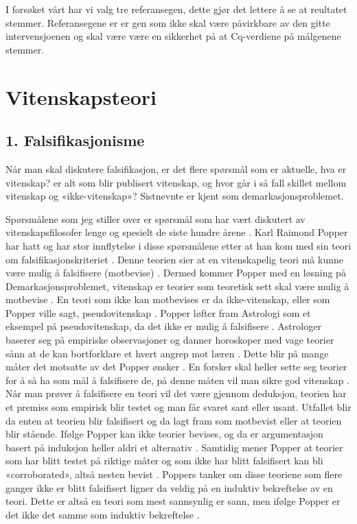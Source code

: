 \documentclass[
]{book}
\begin{document}
I forsøket vårt har vi valg tre referansegen, dette gjør det lettere å se at reultatet stemmer. Referansegene er er gen som ikke skal være påvirkbare av den gitte intervensjoenen og skal være være en sikkerhet på at Cq-verdiene på målgenene stemmer.

\hypertarget{vitenskapsteori}{%
\chapter{Vitenskapsteori}\label{vitenskapsteori}}

\hypertarget{falsifikasjonisme}{%
\section{1. Falsifikasjonisme}\label{falsifikasjonisme}}

Når man skal diskutere falsifikasjon, er det flere spørsmål som er aktuelle, hva er vitenskap? er alt som blir publisert vitenskap, og hvor går i så fall skillet mellom vitenskap og «ikke-vitenskap»? Sistnevnte er kjent som demarkasjonsproblemet.

Spørsmålene som jeg stiller over er spørsmål som har vært diskutert av vitenskapsfilosofer lenge og spesielt de siste hundre årene \citep{okasha2016}. Karl Raimond Popper har hatt og har stor innflytelse i disse spørsmålene etter at han kom med sin teori om falsifikasjonskriteriet \citep{okasha2016}. Denne teorien sier at en vitenskapelig teori må kunne være mulig å falsifisere (motbevise) \citep{popper2002}. Dermed kommer Popper med en løsning på Demarkasjonsproblemet, vitenskap er teorier som teoretisk sett skal være mulig å motbevise \citep{popper2002}. En teori som ikke kan motbevises er da ikke-vitenskap, eller som Popper ville sagt, pseudovitenskap \citep{popper2002}. Popper løfter fram Astrologi som et eksempel på pseudovitenskap, da det ikke er mulig å falsifisere \citep{popper2002}. Astrologer baserer seg på empiriske observasjoner og danner horoskoper med vage teorier sånn at de kan bortforklare et hvert angrep mot læren \citep{popper2002}. Dette blir på mange måter det motsatte av det Popper ønsker \citep{popper2002}. En forsker skal heller sette seg teorier for å så ha som mål å falsifisere de, på denne måten vil man sikre god vitenskap \citep{popper2002}. Når man prøver å falsifisere en teori vil det være gjennom deduksjon, teorien har et premiss som empirisk blir testet og man får svaret sant eller usant. Utfallet blir da enten at teorien blir falsifisert og da lagt fram som motbevist eller at teorien blir stående. Ifølge Popper kan ikke teorier bevises, og da er argumentasjon basert på induksjon heller aldri et alternativ \citep{okasha2016}. Samtidig mener Popper at teorier som har blitt testet på riktige måter og som ikke har blitt falsifisert kan bli «corroborated», altså nesten bevist \citep{popper2002}. Poppers tanker om disse teoriene som flere ganger ikke er blitt falsifisert ligner da veldig på en induktiv bekreftelse av en teori. Dette er altså en teori som mest sannsynlig er sann, men ifølge Popper er det ikke det samme som induktiv bekreftelse \citep{okasha2016, popper2002}.
\end{document}
